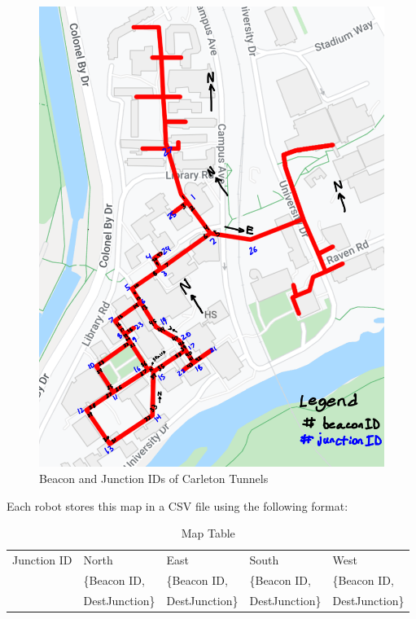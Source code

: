 \documentclass[12pt]{report}
\begin{document}
\begin{figure}[H]
    \centering
    \includegraphics[scale=0.4]{images/map.png}
    \caption{Beacon and Junction IDs of Carleton Tunnels}
    \label{IDmap}
\end{figure}

Each robot stores this map in a CSV file using the following format:

\begin{table}[H]
\centering
\caption{Map Table}
\centering
\begin{tabular} { | p{1.5cm} | p{3cm} | p{3cm} | p{3cm} | p{3cm} | }
\hline
Junction ID & North & East & South & West\\
& \{Beacon ID, & \{Beacon ID, & \{Beacon ID, & \{Beacon ID, \\
&DestJunction\}&DestJunction\}&DestJunction\}&DestJunction\}\\
\hline
\end{tabular}
\end{table}%
\end{document}
